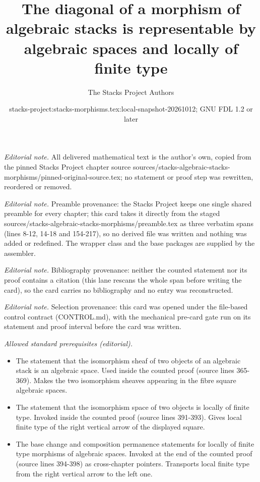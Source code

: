\documentclass[10pt,a4paper]{amsart}
\title{The diagonal of a morphism of algebraic stacks is representable by algebraic spaces and locally of finite type}
\author{The Stacks Project Authors}
\date{stacks-project:stacks-morphisms.tex:local-snapshot-20261012; GNU FDL 1.2 or later}
\theoremstyle{plain}
\theoremstyle{definition}
\theoremstyle{remark}
\numberwithin{equation}{subsection}
\begin{document}
\maketitle
\noindent\textit{Editorial note.} All delivered mathematical text is the author's own, copied from the pinned Stacks Project chapter source sources/stacks-algebraic-stacks-morphisms/pinned-original-source.tex; no statement or proof step was rewritten, reordered or removed.\par\medskip
\noindent\textit{Editorial note.} Preamble provenance: the Stacks Project keeps one single shared preamble for every chapter; this card takes it directly from the staged sources/stacks-algebraic-stacks-morphisms/preamble.tex as three verbatim spans (lines 8-12, 14-18 and 154-217), so no derived file was written and nothing was added or redefined. The wrapper class and the base packages are supplied by the assembler.\par\medskip
\noindent\textit{Editorial note.} Bibliography provenance: neither the counted statement nor its proof contains a citation (this lane rescans the whole span before writing the card), so the card carries no bibliography and no entry was reconstructed.\par\medskip
\noindent\textit{Editorial note.} Selection provenance: this card was opened under the file-based control contract (CONTROL.md), with the mechanical pre-card gate run on its statement and proof interval before the card was written.\par\medskip
\noindent\textit{Allowed standard prerequisites (editorial).}\begin{itemize}
\item The statement that the isomorphism sheaf of two objects of an algebraic stack is an algebraic space. Used inside the counted proof (source lines 365-369). Makes the two isomorphism sheaves appearing in the fibre square algebraic spaces.
\item The statement that the isomorphism space of two objects is locally of finite type. Invoked inside the counted proof (source lines 391-393). Gives local finite type of the right vertical arrow of the displayed square.
\item The base change and composition permanence statements for locally of finite type morphisms of algebraic spaces. Invoked at the end of the counted proof (source lines 394-398) as cross-chapter pointers. Transports local finite type from the right vertical arrow to the left one.
\end{itemize}\medskip
\end{document}
